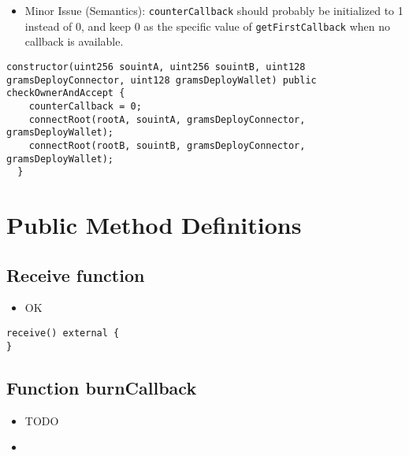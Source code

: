 \begin{itemize}
\item Minor Issue (Semantics): {\tt counterCallback} should probably be
  initialized to 1 instead of 0, and keep 0 as the specific value of
  {\tt getFirstCallback} when no callback is available.
\end{itemize}

\begin{lstlisting}[firstnumber=88]
  constructor(uint256 souintA, uint256 souintB, uint128 gramsDeployConnector, uint128 gramsDeployWallet) public checkOwnerAndAccept {
    counterCallback = 0;
    connectRoot(rootA, souintA, gramsDeployConnector, gramsDeployWallet);
    connectRoot(rootB, souintB, gramsDeployConnector, gramsDeployWallet);
  }
\end{lstlisting}

\section{Public Method Definitions}


\subsection{Receive function}

\begin{itemize}
\item OK
\end{itemize}

\begin{lstlisting}[firstnumber=609]
receive() external {
}
\end{lstlisting}

\subsection{Function burnCallback}

\begin{itemize}
\item TODO
\item \issueEncodeBody
\end{itemize}

